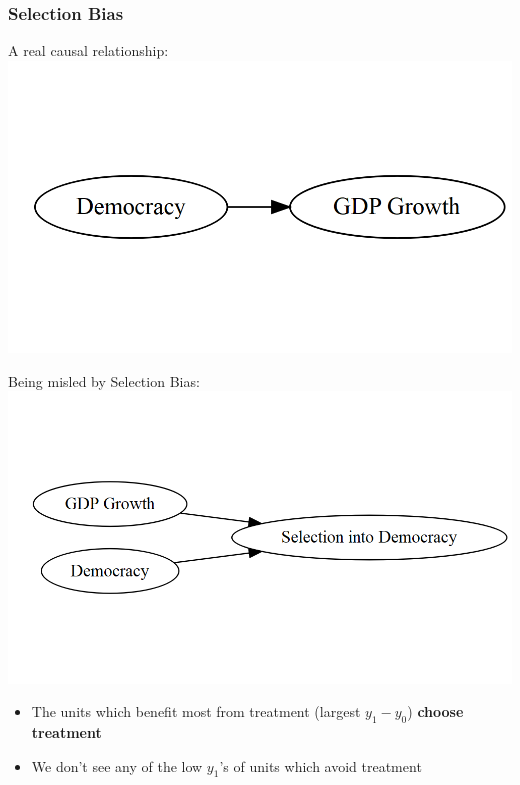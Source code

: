 \documentclass[xcolor=x11names,compress]{beamer}\usepackage[]{graphicx}\usepackage[]{color}
\makeatletter
\def\maxwidth{ %
  \ifdim\Gin@nat@width>\linewidth
    \linewidth
  \else
    \Gin@nat@width
  \fi
}
\newenvironment{knitrout}{}{} %
\renewcommand{\(}{\begin{columns}}
\renewcommand{\)}{\end{columns}}
\newcommand{\<}[1]{\begin{column}{#1}}
\renewcommand{\>}{\end{column}}
\makeatother
\begin{document}
\begin{frame}
\frametitle{Selection Bias}
\begin{multicols}{2}
A real causal relationship:
\begin{knitrout}
\color{fgcolor}
\includegraphics[width=\maxwidth]{figure/explanation9b-1} 

\end{knitrout}
\columnbreak
Being misled by Selection Bias:
\begin{knitrout}
\color{fgcolor}
\includegraphics[width=\maxwidth]{figure/explanation10b-1} 

\end{knitrout}
\end{multicols}
\begin{itemize}
\pause
\item The units which benefit most from treatment (largest $y_1-y_0$) \textbf{choose treatment}
\pause
\item We don't see any of the low $y_1$'s of units which avoid treatment
\end{itemize}
\end{frame}
\end{document}
